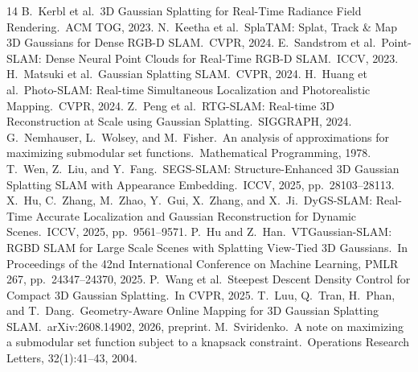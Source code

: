 \documentclass[10pt,twocolumn,letterpaper]{article}
\begin{document}
{\footnotesize

\begin{thebibliography}{14}\itemsep=-4pt
 B.~Kerbl et al.\ 3D Gaussian Splatting for Real-Time Radiance Field Rendering.\ ACM TOG, 2023.
 N.~Keetha et al.\ SplaTAM: Splat, Track \& Map 3D Gaussians for Dense RGB-D SLAM.\ CVPR, 2024.
 E.~Sandstrom et al.\ Point-SLAM: Dense Neural Point Clouds for Real-Time RGB-D SLAM.\ ICCV, 2023.
 H.~Matsuki et al.\ Gaussian Splatting SLAM.\ CVPR, 2024.
 H.~Huang et al.\ Photo-SLAM: Real-time Simultaneous Localization and Photorealistic Mapping.\ CVPR, 2024.
 Z.~Peng et al.\ RTG-SLAM: Real-time 3D Reconstruction at Scale using Gaussian Splatting.\ SIGGRAPH, 2024.
 G.~Nemhauser, L.~Wolsey, and M.~Fisher.\ An analysis of approximations for maximizing submodular set functions.\ Mathematical Programming, 1978.
 T.~Wen, Z.~Liu, and Y.~Fang.\ SEGS-SLAM: Structure-Enhanced 3D Gaussian Splatting SLAM with Appearance Embedding.\ ICCV, 2025, pp.\ 28103--28113.
 X.~Hu, C.~Zhang, M.~Zhao, Y.~Gui, X.~Zhang, and X.~Ji.\ DyGS-SLAM: Real-Time Accurate Localization and Gaussian Reconstruction for Dynamic Scenes.\ ICCV, 2025, pp.\ 9561--9571.
 P.~Hu and Z.~Han.\ VTGaussian-SLAM: RGBD SLAM for Large Scale Scenes with Splatting View-Tied 3D Gaussians.\ In Proceedings of the 42nd International Conference on Machine Learning, PMLR 267, pp.\ 24347--24370, 2025.
 P.~Wang et al.\ Steepest Descent Density Control for Compact 3D Gaussian Splatting.\ In CVPR, 2025.
 T.~Luu, Q.~Tran, H.~Phan, and T.~Dang.\ Geometry-Aware Online Mapping for 3D Gaussian Splatting SLAM.\ arXiv:2608.14902, 2026, preprint.
 M.~Sviridenko.\ A note on maximizing a submodular set function subject to a knapsack constraint.\ Operations Research Letters, 32(1):41--43, 2004.
\end{thebibliography}
}
\end{document}
